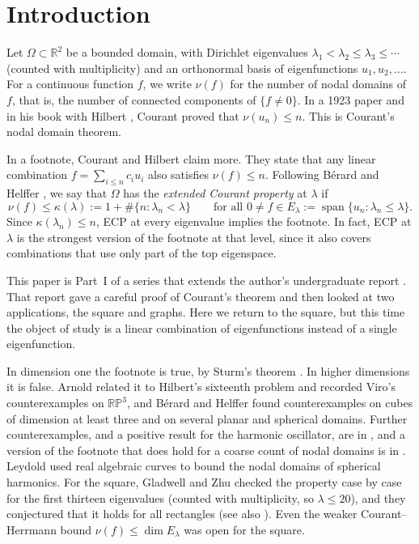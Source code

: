 \documentclass[11pt]{amsart}
\theoremstyle{definition}
\theoremstyle{remark}
\newcommand{\R}{\mathbb{R}}
\numberwithin{equation}{section}
\begin{document}
\section{Introduction}\label{sec:intro}

Let $\Omega\subset\R^2$ be a bounded domain, with Dirichlet eigenvalues
$\lambda_1<\lambda_2\le\lambda_3\le\cdots$ (counted with multiplicity) and an orthonormal basis
of eigenfunctions $u_1,u_2,\dots$. For a continuous function $f$, we write $\nu(f)$ for the
number of nodal domains of $f$, that is, the number of connected components of $\{f\ne0\}$. In a
1923 paper \cite{Courant23} and in his book with Hilbert \cite{CourantHilbert}, Courant proved
that $\nu(u_n)\le n$. This is Courant's nodal domain theorem.

In a footnote, Courant and Hilbert \cite[p.~454]{CourantHilbert} claim more. They state that any
linear combination $f=\sum_{i\le n}c_iu_i$ also satisfies $\nu(f)\le n$. Following Bérard and
Helffer \cite{BH-I}, we say that $\Omega$ has the \emph{extended Courant property} at $\lambda$
if
\[
\nu(f)\le\kappa(\lambda):=1+\#\{n:\lambda_n<\lambda\}\qquad\text{for all }0\ne f\in
E_\lambda:=\operatorname{span}\{u_n:\lambda_n\le\lambda\}. \tag{ECP$_\lambda$}
\]
Since $\kappa(\lambda_n)\le n$, ECP at every eigenvalue implies the footnote. In fact, ECP at
$\lambda$ is the strongest version of the footnote at that level, since it also covers
combinations that use only part of the top eigenspace.

This paper is Part~I of a series that extends the author's undergraduate report
\cite{Sanayei21}. That report gave a careful proof of Courant's theorem and then looked at two
applications, the square and graphs. Here we return to the square, but this time the object of
study is a linear combination of eigenfunctions instead of a single eigenfunction.

In dimension one the footnote is true, by Sturm's theorem \cite{BH-Sturm}. In higher dimensions
it is false. Arnold \cite{Arnold} related it to Hilbert's sixteenth problem and recorded Viro's
counterexamples on $\mathbb{RP}^3$, and Bérard and Helffer \cite{BH-I,BH-II} found
counterexamples on cubes of dimension at least three and on several planar and spherical
domains. Further counterexamples, and a positive result for the harmonic oscillator, are in
\cite{BCH}, and a version of the footnote that does hold for a coarse count of nodal domains
is in \cite{BPPPSS}. Leydold \cite{Leydold} used real algebraic curves to bound the nodal
domains of spherical harmonics. For
the square, Gladwell and Zhu \cite{GladwellZhu,ZhuThesis} checked the property case by case for
the first thirteen eigenvalues (counted with multiplicity, so $\lambda\le20$), and they
conjectured that it holds for all rectangles (see also \cite[\S1.1]{BH-I}). Even the weaker
Courant--Herrmann bound $\nu(f)\le\dim E_\lambda$ was open for the square.
\end{document}
